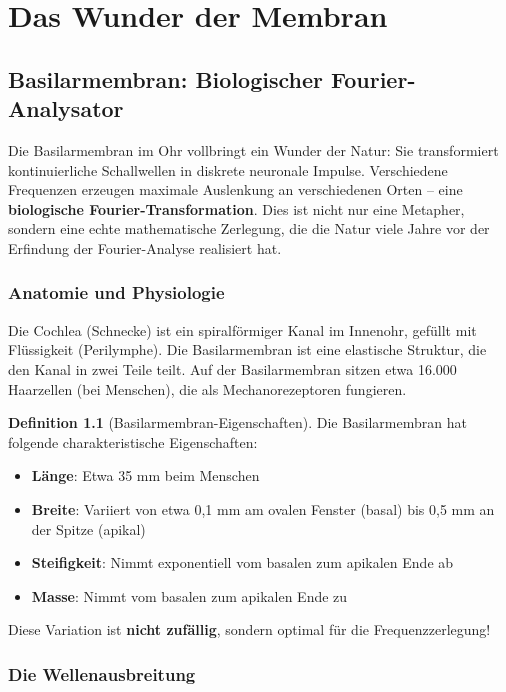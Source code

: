﻿\documentclass[a4paper,12pt]{report}
\theoremstyle{definition}
\newtheorem{definition}{Definition}
\begin{document}
	\chapter{Das Wunder der Membran}
	
	\section{Basilarmembran: Biologischer Fourier-Analysator}
	
	Die Basilarmembran im Ohr vollbringt ein Wunder der Natur: Sie transformiert kontinuierliche Schallwellen in diskrete neuronale Impulse. Verschiedene Frequenzen erzeugen maximale Auslenkung an verschiedenen Orten -- eine \textbf{biologische Fourier-Transformation}. Dies ist nicht nur eine Metapher, sondern eine echte mathematische Zerlegung, die die Natur viele Jahre vor der Erfindung der Fourier-Analyse realisiert hat.
	
	\subsection{Anatomie und Physiologie}
	
	Die Cochlea (Schnecke) ist ein spiralförmiger Kanal im Innenohr, gefüllt mit Flüssigkeit (Perilymphe). Die Basilarmembran ist eine elastische Struktur, die den Kanal in zwei Teile teilt. Auf der Basilarmembran sitzen etwa 16.000 Haarzellen (bei Menschen), die als Mechanorezeptoren fungieren.
	
	\begin{definition}[Basilarmembran-Eigenschaften]
		Die Basilarmembran hat folgende charakteristische Eigenschaften:
		\begin{itemize}
			\item[-] \textbf{Länge}: Etwa 35 mm beim Menschen
			\item[-] \textbf{Breite}: Variiert von etwa 0,1 mm am ovalen Fenster (basal) bis 0,5 mm an der Spitze (apikal)
			\item[-] \textbf{Steifigkeit}: Nimmt exponentiell vom basalen zum apikalen Ende ab
			\item[-] \textbf{Masse}: Nimmt vom basalen zum apikalen Ende zu
		\end{itemize}
		
		Diese Variation ist \textbf{nicht zufällig}, sondern optimal für die Frequenzzerlegung!
	\end{definition}
	
	\subsection{Die Wellenausbreitung}
	
\end{document}
